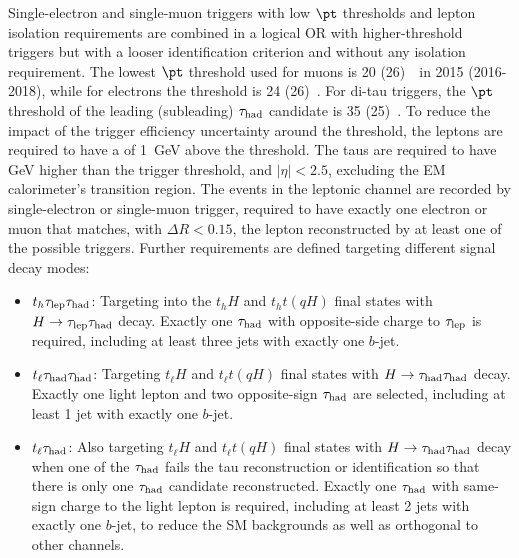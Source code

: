 Single-electron and single-muon triggers with low $\pt$ thresholds and lepton isolation requirements are combined in a logical OR 
with higher-threshold triggers but with a looser identification criterion and without any isolation requirement.
The lowest $\pt$ threshold used for muons is 20 (26)~\gev\ in 2015 (2016-2018), while for electrons the threshold is 24 (26)~\gev.
For di-tau triggers, the $\pt$ threshold of the leading (subleading) $\tau_{\mathrm{had}}$ candidate is 35 (25)~\gev.
To reduce the impact of the trigger efficiency uncertainty around the threshold, the leptons are required to have a \pt of 1~GeV above the threshold. 
The taus are required to have  GeV higher than the trigger threshold, and $|\eta|<2.5$, excluding the EM calorimeter's transition region.
The events in the leptonic channel are recorded by single-electron or single-muon trigger, required to have exactly one electron or muon that matches, with $\Delta R < 0.15$, the lepton reconstructed by at least one of the possible triggers. Further requirements are defined targeting different signal decay modes:  
\begin{itemize}
\item $t_h\tau_{\mathrm{lep}} \tau_{\mathrm{had}}$: Targeting into the $t_hH$ and $t_ht(qH)$ final states with $H\to\tau_{\mathrm{lep}} \tau_{\mathrm{had}}$ decay. Exactly one $\tau_{\mathrm{had}}$ with opposite-side charge to $\tau_{\mathrm{lep}}$ is required, including at least three jets with exactly one $b$-jet.
\item $t_{\ell}\tau_{\mathrm{had}} \tau_{\mathrm{had}}$: Targeting $t_{\ell}H$ and $t_{\ell}t(qH)$ final states with $H\to\tau_{\mathrm{had}} \tau_{\mathrm{had}}$ decay. Exactly one light lepton and two opposite-sign $\tau_{\mathrm{had}}$ are selected, including at least 1 jet with exactly one $b$-jet.
\item $t_{\ell}\tau_{\mathrm{had}}$: Also targeting $t_{\ell}H$ and $t_{\ell}t(qH)$ final states with $H\to\tau_{\mathrm{had}} \tau_{\mathrm{had}}$ decay when one of the $\tau_{\mathrm{had}}$ fails the tau reconstruction or identification so that there is only
  one $\tau_{\mathrm{had}}$ candidate reconstructed. Exactly one $\tau_{\mathrm{had}}$ with same-sign charge to the light lepton is required, including at least 2 jets with exactly one $b$-jet, to
  reduce the SM backgrounds as well as orthogonal to other channels.
\end{itemize}


